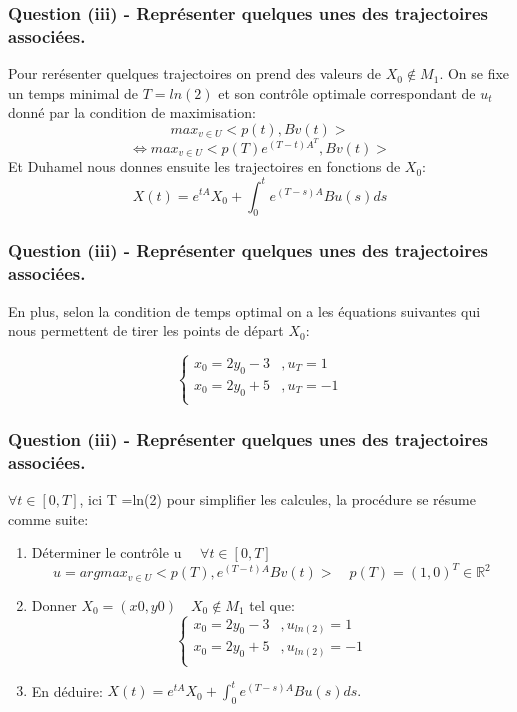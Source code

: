 \documentclass[xcolor=dvipsnames]{beamer}
\newcommand{\R}{\mathbb{R}}
\begin{document}
\begin{frame}
\frametitle{Question (iii) -  Représenter quelques unes des trajectoires associées.}
Pour rerésenter quelques trajectoires on prend des valeurs de $X_0 \notin M_1.$ On se fixe un temps minimal de $T = ln(2)$ et son contrôle optimale correspondant de $u_t$ donné par la condition de maximisation:
$$ max_{v∈U} <p(t),Bv(t)> $$
$$\iff max_{v∈U} <p(T)e^{(T-t)A^T},Bv(t)> $$
Et Duhamel nous donnes ensuite les trajectoires en fonctions de $X_0$:
$$X(t) = e^{tA}X_0 + \int_0^t e^{(T-s)A}Bu(s)ds$$

\end {frame}

\begin{frame}
\frametitle{Question (iii) -  Représenter quelques unes des trajectoires associées.}
En plus, selon la condition de temps optimal on a les équations suivantes qui nous permettent de tirer les points de départ $X_0$:

$$\left\lbrace\begin{array}{ll}
x_0 =  2y_0 - 3  & ,u_T = 1\\
x_0 =  2y_0 + 5  & ,u_T = -1\\
 
\end{array}\right.$$
\end {frame}

\begin{frame}
\frametitle{Question (iii) -  Représenter quelques unes des trajectoires associées.}
$\forall t \in [0,T]$, ici T =ln(2) pour simplifier les calcules, la procédure se résume comme suite:
\begin{enumerate}
\item Déterminer le contrôle u  $\quad \forall t \in [0,T]$ 
$$u= argmax_{v∈U} <p(T),e^{(T-t)A}Bv(t)>  \quad p(T) = (1,0)^T \in \R^2$$
\item Donner $X_0=(x0,y0) \quad X_0 \notin M_1$ tel que:
$$\left\lbrace\begin{array}{ll}
x_0 =  2y_0 - 3  & ,u_{ln(2)} = 1\\
x_0 =  2y_0 + 5  & ,u_{ln(2)} = -1\\
\end{array}\right.$$
\item En déduire: $X(t) = e^{tA}X_0 + \int_0^t e^{(T-s)A}Bu(s)ds.$
\end{enumerate}

\end {frame}
\end{document}
